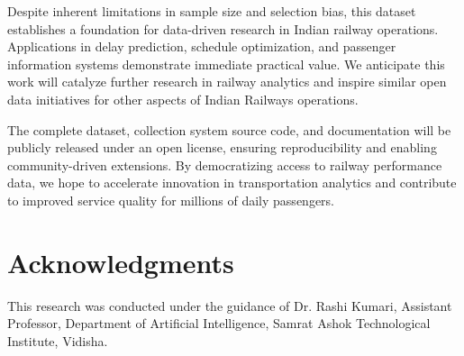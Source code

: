 \documentclass[11pt,a4paper]{article}
\begin{document}
Despite inherent limitations in sample size and selection bias, this dataset establishes a foundation for data-driven research in Indian railway operations. Applications in delay prediction, schedule optimization, and passenger information systems demonstrate immediate practical value. We anticipate this work will catalyze further research in railway analytics and inspire similar open data initiatives for other aspects of Indian Railways operations.

The complete dataset, collection system source code, and documentation will be publicly released under an open license, ensuring reproducibility and enabling community-driven extensions. By democratizing access to railway performance data, we hope to accelerate innovation in transportation analytics and contribute to improved service quality for millions of daily passengers.

\section*{Acknowledgments}

This research was conducted under the guidance of Dr. Rashi Kumari, Assistant Professor, Department of Artificial Intelligence, Samrat Ashok Technological Institute, Vidisha.



\end{document}
